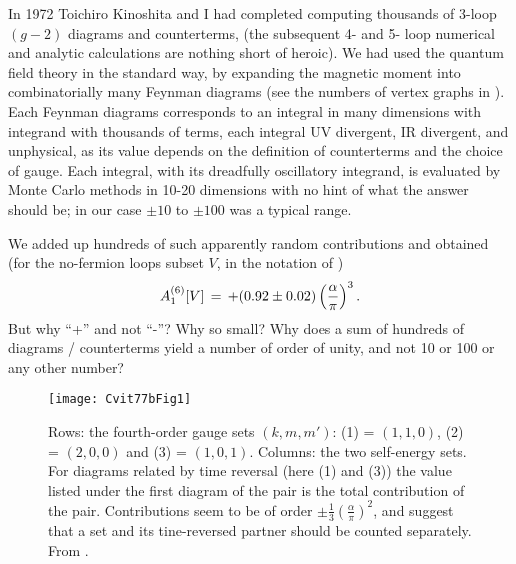 In 1972 Toichiro Kinoshita and I had completed computing thousands of
3-loop $(g-2)$ diagrams and counterterms,
(the subsequent 4- and 5- loop numerical and analytic calculations
are nothing short of heroic).
We had used the quantum field theory in the standard way, by expanding
the magnetic moment into combinatorially many Feynman diagrams (see the
numbers of vertex graphs in ). Each Feynman diagrams
corresponds to an integral in many dimensions with integrand with
thousands of terms, each integral UV divergent, IR divergent, and
unphysical, as its value depends on the definition of counterterms and
the choice of gauge. Each integral, with its dreadfully oscillatory
integrand,  is evaluated by Monte Carlo methods in 10-20 dimensions with
no hint of what the answer should be; in our case $\pm 10$ to $\pm 100$
was a typical range.

We added up hundreds of such apparently random contributions and obtained
(for the no-fermion loops subset $V$, in the notation of
)
\[
 A_1^{(6)}[V]\,=\, +  (0.92 \pm 0.02) \left(\frac{\alpha}{\pi}\right)^3.
\]
But why ``+'' and not ``-''? Why so small? Why does a sum of hundreds of
diagrams / counterterms yield a number of order of unity, and not 10 or
100 or any other number?

\begin{figure}
\begin{center}
\texttt{[image: Cvit77bFig1]}
\end{center}
\caption{\label{Cvit77bFig1}
Rows: the fourth-order gauge sets
$(k,m,m')$: (1) = $(1,1,0)$,
(2) = $(2,0,0)$
and
(3) = $(1,0,1)$.
Columns: the two self-energy sets.
For diagrams related by time
reversal (here (1) and (3))
the value listed under the first diagram of the pair is
the total contribution of the pair. Contributions seem to be of order
$\pm\frac{1}{3}\left(\frac{\alpha}{\pi}\right)^2$, and suggest that
a set and its tine-reversed partner should be counted separately.
From .
}
 \end{figure}

